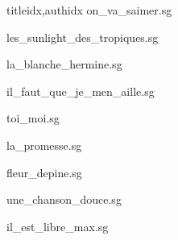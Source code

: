 \documentclass[12pt]{article}
\begin{document}
\begin{songs}{titleidx,authidx}
{on_va_saimer.sg}


{les_sunlight_des_tropiques.sg}


{la_blanche_hermine.sg}


{il_faut_que_je_men_aille.sg}


{toi_moi.sg}


{la_promesse.sg}


{fleur_depine.sg}


{une_chanson_douce.sg}


{il_est_libre_max.sg}



\end{songs}
\end{document}

